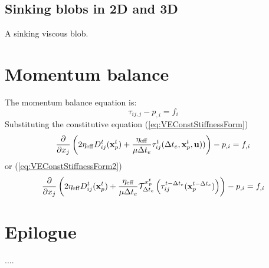 \documentclass[]{svjour3}
\begin{document}


\subsection{Sinking blobs in 2D and 3D}
A sinking viscous blob.




\section{Momentum balance}

The momentum balance equation is:
\begin{equation}
	\tau_{ij,j} - p_{,i} = f_i
\end{equation}
Substituting the constitutive equation (\ref{eq:VEConstStiffnessForm}) 
\begin{equation}
	\frac{\partial }{\partial x_j} \left( 
		2 \eta_{\rm eff} D^t_{ij}(\mathbf{x}^t_p) +
		\frac{\eta_{\rm eff}}{\mu \Delta t_e}
		 {\tau}_{ij}^t(\Delta t_e, \mathbf{x}^t_p, \mathbf{u}) ) \right)
		- p_{,i} = f_{,i}
\end{equation}
or (\ref{eq:VEConstStiffnessForm2}) 
\begin{equation}
	\frac{\partial }{\partial x_j} \left( 
		2 \eta_{\rm eff} D^t_{ij}(\mathbf{x}^t_p) +
		\frac{\eta_{\rm eff}}{\mu \Delta t_e}
		 	\mathcal{T}^{x^t_p}_{\Delta t_e} \left(
			 \tau_{ij}^{t-\Delta t_e}(\mathbf{x}_p^{t-\Delta t_e}) \right) \right)
		- p_{,i} = f_{,i}
\end{equation}


\section{Epilogue}

\begin{acknowledgements}

 ....

\end{acknowledgements}




\end{document}
